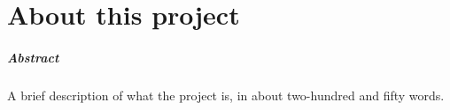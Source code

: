
\chapter*{About this project}
\paragraph{Abstract}
A brief description of what the project is, in about two-hundred and fifty words.